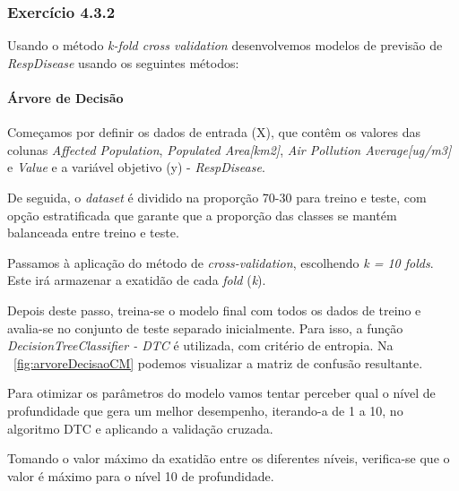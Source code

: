 \documentclass[conference]{IEEEtran}
\begin{document}
\medskip

\subsubsection{\textbf{Exercício 4.3.2}}

Usando o método \textit{k-fold cross validation} desenvolvemos modelos de previsão de \textit{RespDisease} usando os seguintes métodos:

\medskip

\paragraph{Árvore de Decisão}

Começamos por definir os dados de entrada (X), que contêm os valores das colunas \textit{Affected Population}, \textit{Populated Area[km2]}, \textit{Air Pollution Average[ug/m3]} e \textit{Value}  e a variável objetivo (y) - \textit{RespDisease}.

De seguida, o \textit{dataset} é dividido na proporção 70-30 para treino e teste, com opção estratificada que garante que a proporção das classes se mantém balanceada entre treino e teste.

Passamos à aplicação do método de \textit{cross-validation}, escolhendo \textit{k = 10 folds}. Este irá armazenar a exatidão de cada \textit{fold} (\textit{k}).

Depois deste passo, treina-se o modelo final com todos os dados de treino e avalia-se no conjunto de teste separado inicialmente. Para isso, a função \textit{DecisionTreeClassifier - DTC} é utilizada, com critério de entropia. Na \figurename~\ref{fig:arvoreDecisaoCM} podemos visualizar a matriz de confusão resultante.

Para otimizar os parâmetros do modelo vamos tentar perceber qual o nível de profundidade que gera um melhor desempenho, iterando-a de 1 a 10, no algoritmo DTC e aplicando a validação cruzada.

Tomando o valor máximo da exatidão entre os diferentes níveis, verifica-se que o valor é máximo para o nível 10 de profundidade.
\end{document}
